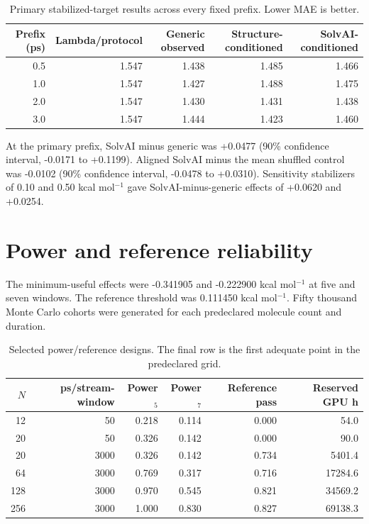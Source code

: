 \documentclass[11pt]{article}
\begin{document}
\begin{table}[ht]
\centering
\caption{Primary stabilized-target results across every fixed prefix. Lower MAE is
better.}
\begin{tabular}{rrrrr}
\toprule
Prefix (ps) & Lambda/protocol & Generic observed & Structure-conditioned & SolvAI-conditioned \\
\midrule
0.5 & 1.547 & 1.438 & 1.485 & 1.466 \\
1.0 & 1.547 & 1.427 & 1.488 & 1.475 \\
2.0 & 1.547 & 1.430 & 1.431 & 1.438 \\
3.0 & 1.547 & 1.444 & 1.423 & 1.460 \\
\bottomrule
\end{tabular}
\end{table}

At the primary prefix, SolvAI minus generic was +0.0477 (90\% confidence interval,
-0.0171 to +0.1199). Aligned SolvAI minus the mean shuffled control was -0.0102
(90\% confidence interval, -0.0478 to +0.0310). Sensitivity stabilizers of 0.10 and
0.50 kcal mol$^{-1}$ gave SolvAI-minus-generic effects of +0.0620 and +0.0254.

\section{Power and reference reliability}

The minimum-useful effects were -0.341905 and -0.222900 kcal mol$^{-1}$ at five and
seven windows. The reference threshold was 0.111450 kcal mol$^{-1}$. Fifty thousand
Monte Carlo cohorts were generated for each predeclared molecule count and duration.

\begin{table}[ht]
\centering
\caption{Selected power/reference designs. The final row is the first adequate point
in the predeclared grid.}
\begin{tabular}{rrrrrr}
\toprule
$N$ & ps/stream-window & Power$_5$ & Power$_7$ & Reference pass & Reserved GPU h \\
\midrule
12 & 50 & 0.218 & 0.114 & 0.000 & 54.0 \\
20 & 50 & 0.326 & 0.142 & 0.000 & 90.0 \\
20 & 3000 & 0.326 & 0.142 & 0.734 & 5401.4 \\
64 & 3000 & 0.769 & 0.317 & 0.716 & 17284.6 \\
128 & 3000 & 0.970 & 0.545 & 0.821 & 34569.2 \\
256 & 3000 & 1.000 & 0.830 & 0.827 & 69138.3 \\
\bottomrule
\end{tabular}
\end{table}
\end{document}
